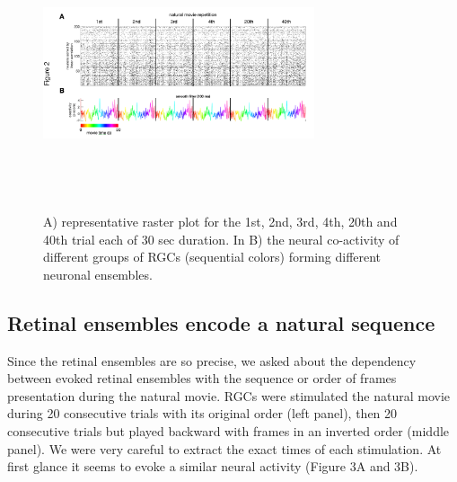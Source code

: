 \documentclass[9pt,twocolumn,twoside,lineno]{pnas-new}
\begin{document}
\begin{figure}
\centering
\includegraphics[width=8cm,height=8cm]{Fig 2.png}
\caption{A) representative raster plot for the 1st, 2nd, 3rd, 4th, 20th and 40th trial each of 30 sec duration. In B) the neural co-activity of different groups of RGCs (sequential colors) forming different neuronal ensembles. }
\label{fig:Figure_2.pdf}
\end{figure}

\subsection*{Retinal ensembles encode a natural sequence}

Since the retinal ensembles are so precise, we asked about the dependency between evoked retinal ensembles with the sequence or order of frames presentation during the natural movie. RGCs were stimulated the natural movie during 20 consecutive trials with its original order (left panel), then 20 consecutive trials but played backward with frames in an inverted order (middle panel). We were very careful to extract the exact times of each stimulation. At first glance it seems to evoke a similar neural activity (Figure 3A and 3B). 
\end{document}
